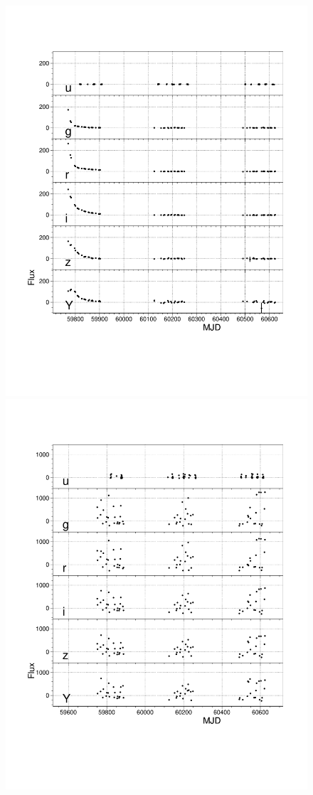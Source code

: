 \begin{figure}[htbp!]
\begin{center}
\includegraphics[scale=0.4,trim = 15mm 45mm 10mm 20mm, clip]{figures/lcplot_model01b.pdf}
\includegraphics[scale=0.4,trim = 15mm 45mm 10mm 20mm, clip]{figures/lcplot_model80.pdf}

\end{center}
\end{figure}
